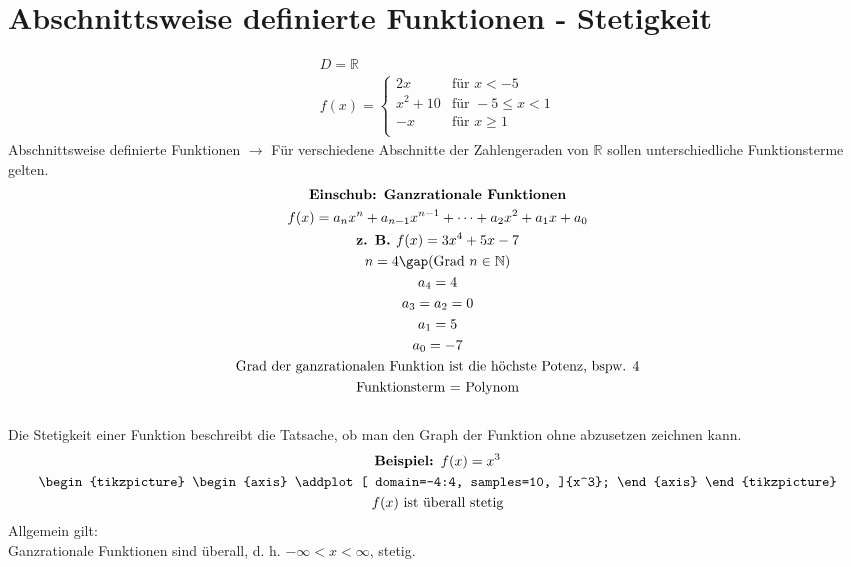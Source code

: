 \section{Abschnittsweise definierte Funktionen - Stetigkeit}
\begin{gather*}
  D = \mathbb{R} \\
  f(x) =
  \begin{cases}
    2x & \text{für } x < -5 \\
    x^2 + 10 & \text{für } -5 \leq x < 1 \\
    -x & \text{für } x \geq 1 \\
  \end{cases}
\end{gather*}
Abschnittsweise definierte Funktionen $\rightarrow$ Für verschiedene Abschnitte der Zahlengeraden von $\mathbb{R}$ sollen unterschiedliche Funktionsterme gelten. \\
\begin{gather*}
  \textbf{Einschub: Ganzrationale Funktionen} \\
  f(x) = a_nx^n + a_{n-1}x^{n-1} + \dots + a_2x^2 + a_1x + a_0 \\
  \textbf{z. B. } f(x) = 3x^4 + 5x - 7 \\
  n = 4 \gap\text{(Grad } n \in \mathbb{N}\text{)} \\ a_4 = 4 \\ a_3 = a_2 = 0 \\ a_1 = 5 \\ a_0 = -7 \\
  \text{Grad der ganzrationalen Funktion ist die höchste Potenz, bspw. 4} \\
  \text{Funktionsterm = Polynom}
\end{gather*} \\
Die Stetigkeit einer Funktion beschreibt die Tatsache, ob man den Graph der Funktion ohne abzusetzen zeichnen kann.
\begin{gather*}
  \textbf{Beispiel: } f(x) = x^3 \\
  \begin{tikzpicture}
    \begin{axis}
      \addplot[
      domain=-4:4,
      samples=10,
      ]{x^3};
    \end{axis}
  \end{tikzpicture} \\ 
  f(x) \text{ ist überall stetig}
\end{gather*}
Allgemein gilt: \\ Ganzrationale Funktionen sind überall, d. h. $-\infty < x < \infty$, stetig. \\
